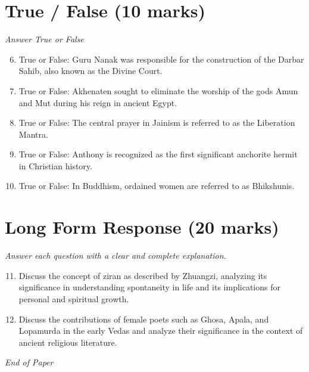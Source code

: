 \documentclass[12pt]{article}
\begin{document}
\section*{True / False (10 marks)}
\textit{Answer True or False}
\begin{enumerate}[label=\arabic*.]
\setcounter{enumi}{5}
\item True or False: Guru Nanak was responsible for the construction of the Darbar Sahib, also known as the Divine Court.
\item True or False: Akhenaten sought to eliminate the worship of the gods Amun and Mut during his reign in ancient Egypt.
\item True or False: The central prayer in Jainism is referred to as the Liberation Mantra.
\item True or False: Anthony is recognized as the first significant anchorite hermit in Christian history.
\item True or False: In Buddhism, ordained women are referred to as Bhikshunis.
\end{enumerate}

\section*{Long Form Response (20 marks)}
\textit{Answer each question with a clear and complete explanation.}
\begin{enumerate}[label=\arabic*.]
\setcounter{enumi}{10}
\item Discuss the concept of ziran as described by Zhuangzi, analyzing its significance in understanding spontaneity in life and its implications for personal and spiritual growth.
\item Discuss the contributions of female poets such as Ghosa, Apala, and Lopamurda in the early Vedas and analyze their significance in the context of ancient religious literature.
\end{enumerate}

\vfill
\noindent\textit{End of Paper}
\end{document}
